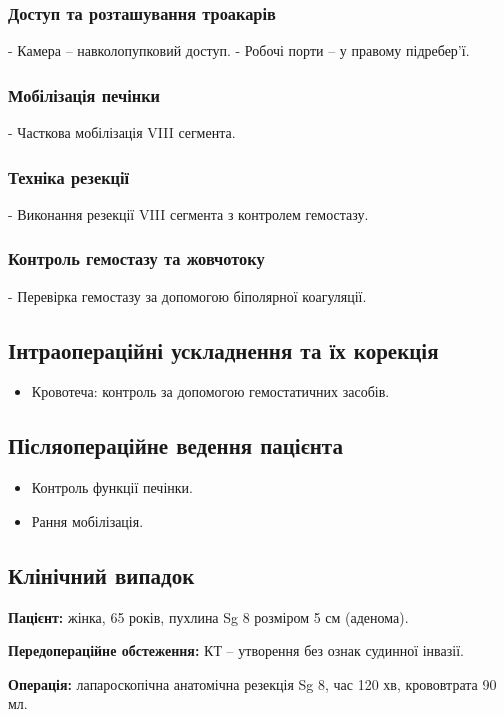 \begin{refsection}
\subsubsection{Доступ та розташування троакарів}
- Камера – навколопупковий доступ.
- Робочі порти – у правому підребер'ї.

\subsubsection{Мобілізація печінки}
- Часткова мобілізація VIII сегмента.

\subsubsection{Техніка резекції}
- Виконання резекції VIII сегмента з контролем гемостазу.

\subsubsection{Контроль гемостазу та жовчотоку}
- Перевірка гемостазу за допомогою біполярної коагуляції.

\subsection{Інтраопераційні ускладнення та їх корекція}
\begin{itemize}
    \item Кровотеча: контроль за допомогою гемостатичних засобів.
\end{itemize}

\subsection{Післяопераційне ведення пацієнта}
\begin{itemize}
    \item Контроль функції печінки.
    \item Рання мобілізація.
\end{itemize}

\subsection{Клінічний випадок}
\textbf{Пацієнт:} жінка, 65 років, пухлина Sg 8 розміром 5 см (аденома).

\textbf{Передопераційне обстеження:} КТ – утворення без ознак судинної інвазії.

\textbf{Операція:} лапароскопічна анатомічна резекція Sg 8, час 120 хв, крововтрата 90 мл.


\end{refsection}
